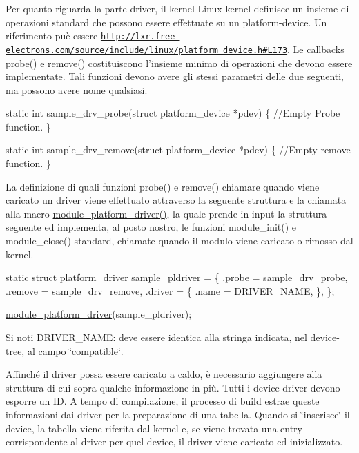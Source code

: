 Per quanto riguarda la parte driver, il kernel Linux kernel definisce un insieme di operazioni standard che possono essere effettuate su un platform-\/device. Un riferimento puè essere \href{http://lxr.free-electrons.com/source/include/linux/platform_device.h#L173}{\tt http\+://lxr.\+free-\/electrons.\+com/source/include/linux/platform\+\_\+device.\+h\#\+L173}. Le callbacks probe() e remove() costituiscono l'insieme minimo di operazioni che devono essere implementate. Tali funzioni devono avere gli stessi parametri delle due seguenti, ma possono avere nome qualsiasi.


\begin{DoxyCode}
\textcolor{keyword}{static} \textcolor{keywordtype}{int} sample\_drv\_probe(\textcolor{keyword}{struct} platform\_device *pdev) \{
        \textcolor{comment}{//Empty Probe function.}
\}

\textcolor{keyword}{static} \textcolor{keywordtype}{int} sample\_drv\_remove(\textcolor{keyword}{struct} platform\_device *pdev) \{
        \textcolor{comment}{//Empty remove function.}
\}
\end{DoxyCode}


La definizione di quali funzioni probe() e remove() chiamare quando viene caricato un driver viene effettuato attraverso la seguente struttura e la chiamata alla macro \hyperlink{group___linux-_driver_ga61e890be90fe5582db8048893ca0ebbf}{module\+\_\+platform\+\_\+driver()}, la quale prende in input la struttura seguente ed implementa, al posto nostro, le funzioni module\+\_\+init() e module\+\_\+close() standard, chiamate quando il modulo viene caricato o rimosso dal kernel.


\begin{DoxyCode}
\textcolor{keyword}{static} \textcolor{keyword}{struct }platform\_driver sample\_pldriver = \{
    .probe  = sample\_drv\_probe,
    .remove = sample\_drv\_remove,
    .driver = \{
        .name  = \hyperlink{group___linux-_driver_ga25634d21648ca7fb7a2aca614bafaaeb}{DRIVER\_NAME},
    \},
\};

\hyperlink{group___linux-_driver_ga61e890be90fe5582db8048893ca0ebbf}{module\_platform\_driver}(sample\_pldriver);
\end{DoxyCode}


Si noti D\+R\+I\+V\+E\+R\+\_\+\+N\+A\+M\+E\+: deve essere identica alla stringa indicata, nel device-\/tree, al campo \char`\"{}compatible\char`\"{}.

Affinché il driver possa essere caricato a caldo, è necessario aggiungere alla struttura di cui sopra qualche informazione in più. Tutti i device-\/driver devono esporre un I\+D. A tempo di compilazione, il processo di build estrae queste informazioni dai driver per la preparazione di una tabella. Quando si \char`\"{}inserisce\char`\"{} il device, la tabella viene riferita dal kernel e, se viene trovata una entry corrispondente al driver per quel device, il driver viene caricato ed inizializzato.

